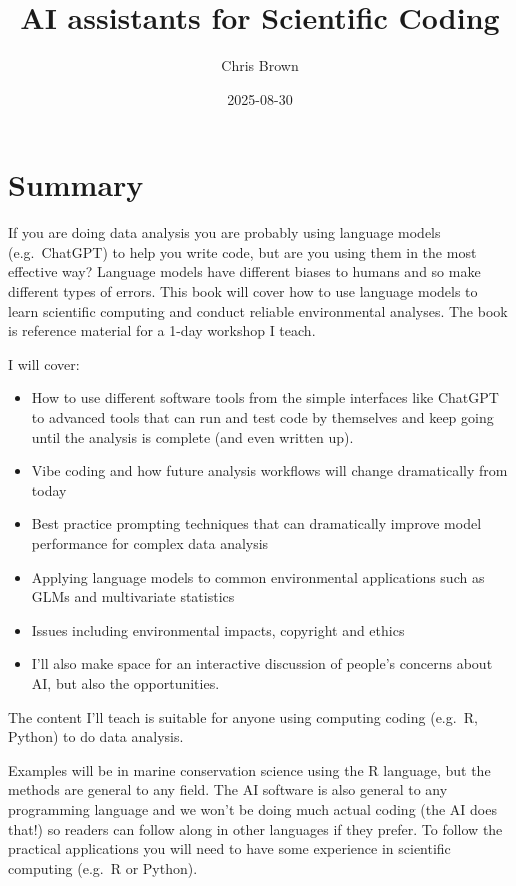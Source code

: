 \documentclass[
  letterpaper,
  DIV=11,
  numbers=noendperiod]{scrreprt}
\title{AI assistants for Scientific Coding}
\author{Chris Brown}
\date{2025-08-30}
\renewcommand*\contentsname{Table of contents}
\newcommand\contentsname{Table of contents}
\begin{document}
\maketitle

\renewcommand*\contentsname{Table of contents}
{
\hypersetup{linkcolor=}
\setcounter{tocdepth}{2}
\tableofcontents
}


\chapter{Summary}\label{summary}

If you are doing data analysis you are probably using language models
(e.g.~ChatGPT) to help you write code, but are you using them in the
most effective way? Language models have different biases to humans and
so make different types of errors. This book will cover how to use
language models to learn scientific computing and conduct reliable
environmental analyses. The book is reference material for a 1-day
workshop I teach.

I will cover:

\begin{itemize}
\item
  How to use different software tools from the simple interfaces like
  ChatGPT to advanced tools that can run and test code by themselves and
  keep going until the analysis is complete (and even written up).
\item
  Vibe coding and how future analysis workflows will change dramatically
  from today
\item
  Best practice prompting techniques that can dramatically improve model
  performance for complex data analysis
\item
  Applying language models to common environmental applications such as
  GLMs and multivariate statistics
\item
  Issues including environmental impacts, copyright and ethics
\item
  I'll also make space for an interactive discussion of people's
  concerns about AI, but also the opportunities.
\end{itemize}

The content I'll teach is suitable for anyone using computing coding
(e.g.~R, Python) to do data analysis.

Examples will be in marine conservation science using the R language,
but the methods are general to any field. The AI software is also
general to any programming language and we won't be doing much actual
coding (the AI does that!) so readers can follow along in other
languages if they prefer. To follow the practical applications you will
need to have some experience in scientific computing (e.g.~R or Python).
\end{document}
